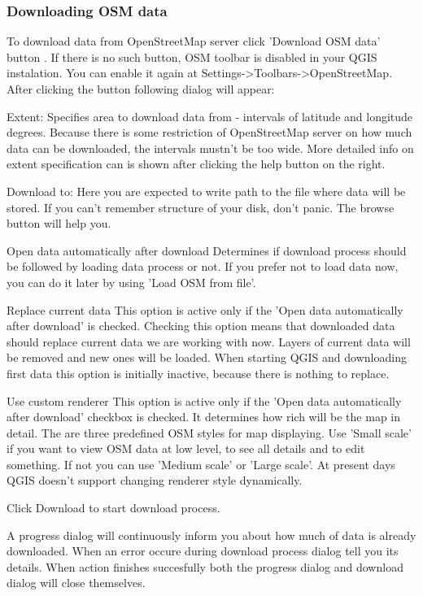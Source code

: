 \subsubsection{Downloading OSM data}  

To download data from OpenStreetMap server click 'Download OSM data' button
.
If there is no such button, OSM toolbar is disabled in your QGIS instalation.
You can enable it again at Settings->Toolbars->OpenStreetMap.
After clicking the button following dialog will appear:

\begin{description}
\item Extent: Specifies area to download data from - intervals of latitude 
and longitude degrees. Because there is some restriction of OpenStreetMap 
server on how much data can be downloaded, the intervals mustn't be too 
wide. More detailed info on extent specification can is shown after 
clicking the help button on the right.
\item Download to: 
Here you are expected to write path to the file where data will be stored. If
you can't remember structure of your disk, don't panic. The browse button
will help you.
\item Open data automatically after download 
Determines if download process should be followed by loading data process or
not. If you prefer not to load data now, you can do it later by using 'Load
OSM from file'.
\item Replace current data
This option is active only if the 'Open data automatically after download' is
checked. Checking this option means that downloaded data should replace
current data we are working with now. Layers of current data will be removed
and new ones will be loaded. When starting QGIS and downloading first data
this option is initially inactive, because there is nothing to replace.
\item Use custom renderer
This option is active only if the 'Open data automatically after download'
checkbox is checked. It determines how rich will be the map in detail. The
are three predefined OSM styles for map displaying. Use 'Small scale' if you
want to view OSM data at low level, to see all details and to edit something.
If not you can use 'Medium scale' or 'Large scale'. At present days QGIS
doesn't support changing renderer style dynamically.
\end{description}

Click Download to start download process.

A progress dialog will continuously inform you about how much of data is
already downloaded. When an error occure during download process dialog tell
you its details. When action finishes succesfully both the progress dialog
and download dialog will close themselves.

